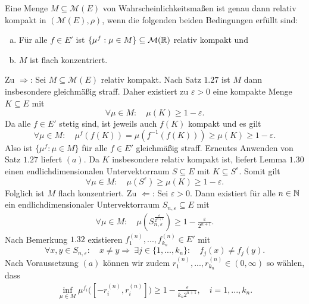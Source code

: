 \begin{theorem}
    Eine Menge $M \subseteq \mathcal{M}(E)$ von Wahrscheinlichkeitsmaßen ist genau dann relativ kompakt in $(\mathcal{M}(E), \rho)$, wenn die folgenden beiden Bedingungen erfüllt sind:
    \begin{enumerate}[(a)]
        \item Für alle $f \in E'$ ist $\{\mu^f : \mu \in M\} \subseteq \mathcal{M}(\mathbb{R})$ relativ kompakt und
        \item $M$ ist flach konzentriert. 
    \end{enumerate}
\end{theorem}

\begin{proof*}
    Zu $\Rightarrow$: 
    Sei $M \subseteq \mathcal{M}(E)$ relativ kompakt. Nach Satz $1.27$ ist $M$ dann insbesondere gleichmäßig straff. 
    Daher existiert zu $\varepsilon > 0$ eine kompakte Menge $K \subseteq E$ mit 
    $$
        \forall \mu \in M: \quad \mu(K) \geq 1 - \varepsilon.   
    $$ 
    Da alle $f \in E'$ stetig sind, ist jeweils auch $f(K)$ kompakt und es gilt
    $$
        \forall \mu \in M: \quad \mu^f(f(K)) = \mu(f^{-1}(f(K))) \geq \mu(K) \geq 1 - \varepsilon. 
    $$
    Also ist $\{\mu^f : \mu \in M\}$ für alle $f \in E'$ gleichmäßig straff. Erneutes Anwenden von Satz $1.27$  liefert $(a)$. 
    Da $K$ insbesondere relativ kompakt ist, liefert Lemma $1.30$ einen endlichdimensionalen Untervektorraum $S \subseteq E$ mit $K \subseteq S^{\varepsilon}$. Somit gilt
    $$
        \forall \mu \in M: \quad \mu(S^{\varepsilon}) \geq \mu(K) \geq 1 - \varepsilon.
    $$
    Folglich ist $M$ flach konzentriert. 
    \newline 
    Zu $\Leftarrow$: 
    Sei $\varepsilon > 0$. Dann existiert für alle $n \in \mathbb{N}$ ein endlichdimensionaler Untervektorraum $S_{n, \varepsilon} \subseteq E$ mit 
    \begin{align}
        \forall \mu \in M: \quad \mu(S_{n, \varepsilon}^{\frac{\varepsilon}{2^{n+1}}}) \geq 1 - \frac{\varepsilon}{2^{n+1}}.
    \end{align}
    Nach Bemerkung $1.32$ existieren $f_1^{(n)},...,f_{k_n}^{(n)} \in E'$ mit 
    $$
        \forall x,y \in S_{n, \varepsilon}: \quad x \neq y \Rightarrow \ \exists j \in \{1,...,k_n\}: \quad f_j(x) \neq f_j(y). 
    $$
    Nach Voraussetzung $(a)$ können wir zudem $r_1^{(n)},...,r_{k_n}^{(n)} \in (0, \infty)$ so wählen, dass
    \begin{align}
        \inf_{\mu \in M} \mu^{f_i}\big([-r_i^{(n)}, r_i^{(n)}]\big) \geq 1 - \frac{\varepsilon}{k_n 2^{n+1}}, \quad i=1,...,k_n.

\end{align}
\end{proof*}
